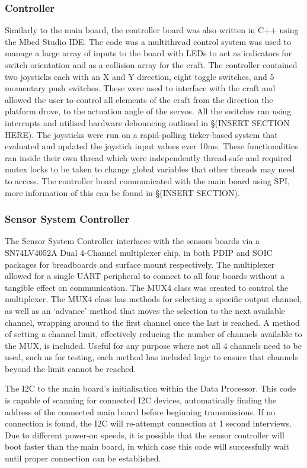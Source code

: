 \documentclass [12pt]{article}
\begin{document}
\subsubsection{Controller}
Similarly to the main board, the controller board was also written in C++ using the Mbed Studio IDE. The code was a multithread control system was used to manage a large array of inputs to the board with LEDs to act as indicators for switch orientation and as a collision array for the craft. The controller contained two joysticks each with an X and Y direction, eight toggle switches, and 5 momentary push switches. These were used to interface with the craft and allowed the user to control all elements of the craft from the direction the platform drove, to the actuation angle of the servos. All the switches ran using interrupts and utilised hardware debouncing outlined in §(INSERT SECTION HERE). The joysticks were run on a rapid-polling ticker-based system that evaluated and updated the joystick input values ever 10ms. These functionalities ran inside their own thread which were independently thread-safe and required mutex locks to be taken to change global variables that other threads may need to access. The controller board communicated with the main board using SPI, more information of this can be found in §(INSERT SECTION).
\subsubsection{Sensor System Controller}
 
The Sensor System Controller interfaces with the sensors boards via a SN74LV4052A Dual 4-Channel multiplexer chip, in both PDIP and SOIC packages for breadboards and surface mount respectively. The multiplexer allowed for a single UART peripheral to connect to all four boards without a tangible effect on communication. The MUX4 class was created to control the multiplexer.
The MUX4 class has methods for selecting a specific output channel, as well as an ‘advance’ method that moves the selection to the next available channel, wrapping around to the first channel once the last is reached.
A method of setting a channel limit, effectively reducing the number of channels available to the MUX, is included. Useful for any purpose where not all 4 channels need to be used, such as for testing, each method has included logic to ensure that channels beyond the limit cannot be reached.
 
The I2C to the main board’s initialisation within the Data Processor. This code is capable of scanning for connected I2C devices, automatically finding the address of the connected main board before beginning transmissions. If no connection is found, the I2C will re-attempt connection at 1 second interviews. Due to different power-on speeds, it is possible that the sensor controller will boot faster than the main board, in which case this code will successfully wait until proper connection can be established.
\end{document}
